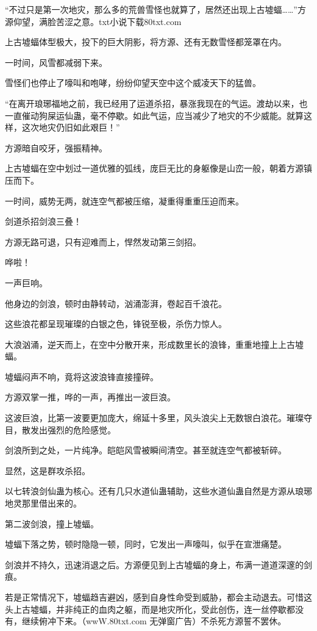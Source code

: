 
\begin{this_body}

“不过只是第一次地灾，那么多的荒兽雪怪也就算了，居然还出现上古墟蝠……”方源仰望，满脸苦涩之意。txt小说下载80txt.com

上古墟蝠体型极大，投下的巨大阴影，将方源、还有无数雪怪都笼罩在内。

一时间，风雪都减弱下来。

雪怪们也停止了嚎叫和咆哮，纷纷仰望天空中这个威凌天下的猛兽。

“在离开琅琊福地之前，我已经用了运道杀招，暴涨我现在的气运。渡劫以来，也一直催动狗屎运仙蛊，毫不停歇。如此气运，应当减少了地灾的不少威能。就算这样，这次地灾仍旧如此艰巨！”

方源暗自咬牙，强振精神。

上古墟蝠在空中划过一道优雅的弧线，庞巨无比的身躯像是山峦一般，朝着方源镇压而下。

一时间，威势无两，就连空气都被压缩，凝重得重重压迫而来。

剑道杀招剑浪三叠！

方源无路可退，只有迎难而上，悍然发动第三剑招。

哗啦！

一声巨响。

他身边的剑浪，顿时由静转动，汹涌澎湃，卷起百千浪花。

这些浪花都呈现璀璨的白银之色，锋锐至极，杀伤力惊人。

大浪汹涌，逆天而上，在空中分散开来，形成数里长的浪锋，重重地撞上上古墟蝠。

墟蝠闷声不响，竟将这波浪锋直接撞碎。

方源双掌一推，哗的一声，再推出一波巨浪。

这波巨浪，比第一波要更加庞大，绵延十多里，风头浪尖上无数银白浪花。璀璨夺目，散发出强烈的危险感觉。

剑浪所到之处，一片纯净。皑皑风雪被瞬间清空。甚至就连空气都被斩碎。

显然，这是群攻杀招。

以七转浪剑仙蛊为核心。还有几只水道仙蛊辅助，这些水道仙蛊自然是方源从琅琊地灵那里借出来的。

第二波剑浪，撞上墟蝠。

墟蝠下落之势，顿时隐隐一顿，同时，它发出一声嚎叫，似乎在宣泄痛楚。

剑浪并不持久，迅速消退之后。方源便见到上古墟蝠的身上，布满一道道深邃的剑痕。

若是正常情况下，墟蝠趋吉避凶，感到自身性命受到威胁，都会主动退去。可惜这头上古墟蝠，并非纯正的血肉之躯，而是地灾所化，受此创伤，连一丝停歇都没有，继续俯冲下来。（wwW.80txt.com 无弹窗广告）不杀死方源誓不罢休。


\end{this_body}
